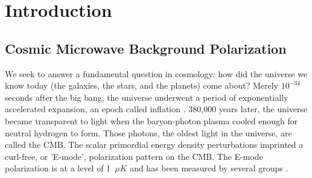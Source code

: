 \chapter{Introduction}
\label{intro_chapter}




\section{Cosmic Microwave Background Polarization}
\label{sec:cmb_science}


We seek to answer a fundamental question in cosmology:  how did the universe we know today (the galaxies, the stars, and the planets) come about?  
Merely $10^{-34}$ seconds after the big bang, the universe underwent a period of exponentially accelerated expansion, an epoch called inflation \cite{Guth1981} \cite{Linde1982} \cite{peebles} \cite{Spergel2007} \cite{Tegmark2006} \cite{PlanckXIII} \cite{PlanckXX}.  
380,000 years later, the universe became transparent to light when the baryon-photon plasma cooled enough for neutral hydrogen to form. 
Those photons, the oldest light in the universe, are called the \ac{CMB}.
The scalar primordial energy density perturbations imprinted a curl-free, or 'E-mode', polarization pattern on the \ac{CMB}. 
The E-mode polarization is at a level of 1~$\mu K$ and has been measured by several groups \cite{leitch2005} \cite{montroy2006} \cite{wu2007} \cite{sievers2007} \cite{nolta2009}. 

